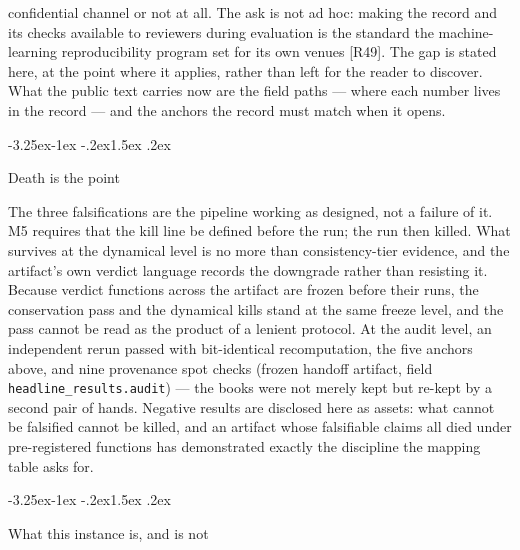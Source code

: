 \documentclass[11pt,a4paper]{article}
\makeatletter
\renewcommand\subsection{\@startsection{subsection}{2}{\z@}%
  {-3.25ex\@plus -1ex \@minus -.2ex}{1.5ex \@plus .2ex}%
  {\normalfont\large\bfseries\raggedright}}
\makeatother
\begin{document}
confidential channel or not at all. The ask is not ad hoc: making the record and its checks available to reviewers during evaluation is the standard the machine-learning reproducibility program set for its own venues [R49]. The gap is stated here, at the point where it applies, rather than left for the reader to discover. What the public text carries now are the field paths — where each number lives in the record — and the anchors the record must match when it opens.

\subsection{Death is the point}

The three falsifications are the pipeline working as designed, not a failure of it. M5 requires that the kill line be defined before the run; the run then killed. What survives at the dynamical level is no more than consistency-tier evidence, and the artifact's own verdict language records the downgrade rather than resisting it. Because verdict functions across the artifact are frozen before their runs, the conservation pass and the dynamical kills stand at the same freeze level, and the pass cannot be read as the product of a lenient protocol. At the audit level, an independent rerun passed with bit-identical recomputation, the five anchors above, and nine provenance spot checks (frozen handoff artifact, field \texttt{headline\_\allowbreak results.audit}) — the books were not merely kept but re-kept by a second pair of hands. Negative results are disclosed here as assets: what cannot be falsified cannot be killed, and an artifact whose falsifiable claims all died under pre-registered functions has demonstrated exactly the discipline the mapping table asks for.

\subsection{What this instance is, and is not}
\end{document}
